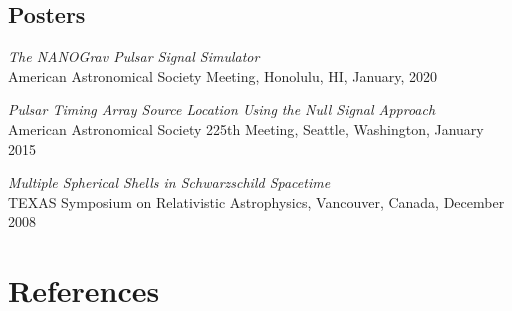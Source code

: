 \documentclass[11pt,letterpaper,sans,unicode]{moderncv}
\newcommand{\talkitem}[3]{\item \textit{#1}\\{#2}, #3} %
\begin{document}
\subsection{Posters}
\begin{etaremune}[leftmargin=8mm]
\small
\talkitem{The NANOGrav Pulsar Signal Simulator}{American Astronomical Society Meeting}{Honolulu, HI, January, 2020}
\talkitem{Pulsar Timing Array Source Location Using the Null Signal Approach}{American Astronomical Society 225th Meeting}{Seattle, Washington, January 2015}
\talkitem{Multiple Spherical Shells in Schwarzschild Spacetime}{TEXAS Symposium on Relativistic Astrophysics}{Vancouver, Canada, December 2008}
\end{etaremune}

\section{References}
\end{document}
